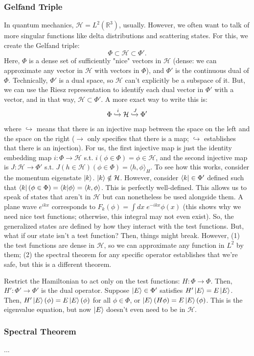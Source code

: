 \documentclass[11pt]{article}
\begin{document}
	\subsubsection*{Gelfand Triple}
	In quantum mechanics, $\mathcal{H}=L^2(\mathbb{R}^3)$, usually. However, we often want to talk of more singular functions like delta distributions and scattering states. For this, we create the Gelfand triple:
	$$
	\Phi \subset \mathcal{H} \subset \Phi'.
	$$
	Here, $\Phi$ is a dense set of sufficiently "nice" vectors in $\mathcal{H}$ (dense: we can approximate any vector in $\mathcal{H}$ with vectors in $\Phi$), and $\Phi'$ is the continuous dual of $\Phi$. Technically, $\Phi'$ is a dual space, so $\mathcal{H}$ can't explicitly be a subspace of it. But, we can use the Riesz representation to identify each dual vector in $\Phi'$ with a vector, and in that way, $\mathcal{H}\subset \Phi'$. A more exact way to write this is:
	$$
	\Phi \xhookrightarrow[]{i} \mathcal{H}\xhookrightarrow[]{J}\Phi'
	$$
	where $\hookrightarrow$ means that there is an injective map between the space on the left and the space on the right ($\rightarrow$ only specifies that there is a map; $\hookrightarrow$ establishes that there is an injection). For us, the first injective map is just the identity embedding map $i: \Phi \rightarrow \mathcal{H}$ s.t. $i(\phi\in \Phi) =\phi \in \mathcal{H}$, and the second injective map is $J:\mathcal{H}\rightarrow \Phi'$ s.t. $J(h\in\mathcal{H})(\phi\in\Phi) = \langle h, \phi\rangle_H$. To see how this works, consider the momentum eigenstate $\ket{k}$. $\ket{k}\notin\mathcal{H}$. However, consider $\bra{k}\in \Phi'$ defined such that $\bra{k}(\phi\in \Phi) = \langle k | \phi\rangle=\langle k, \phi\rangle$. This is perfectly well-defined. This allows us to speak of states that aren't in $\mathcal{H}$ but can nonetheless be used alongside them. A plane wave $e^{ikx}$ corresponds to $F_k(\phi)=\int dx\; e^{-ikx}\phi(x)$ (this shows why we need nice test functions; otherwise, this integral may not even exist). So, the generalized states are defined by how they interact with the test functions. But, what if our state isn't a test function? Then, things might break. However, (1) the test functions are dense in $\mathcal{H}$, so we can approximate any function in $L^2$ by them; (2) the spectral theorem for any specific operator establishes that we're safe, but this is a different theorem.
	
	Restrict the Hamiltonian to act only on the test functions: $H:\Phi\rightarrow \Phi$. Then, $H': \Phi' \rightarrow \Phi'$ is the dual operator. Suppose $\ket{E}\in \Phi'$ satisfies $H'\ket{E}=E\ket{E}$. Then, $H'\ket{E}(\phi)=E\ket{E}(\phi)$ for all $\phi\in\Phi$, or $\ket{E}(H\phi) = E\ket{E}(\phi)$. This is the eigenvalue equation, but now $\ket{E}$ doesn't even need to be in $\mathcal{H}$. 
	
	\subsubsection*{Spectral Theorem}
	...
\end{document}
